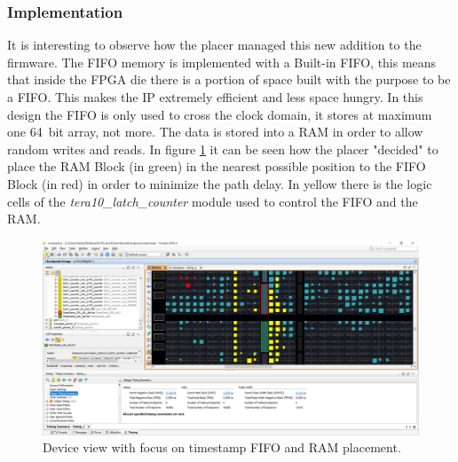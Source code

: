 \subsubsection{Implementation}
\noindent It is interesting to observe how the placer managed this new addition to the firmware. The FIFO memory is implemented with a Built-in FIFO, this means that inside the FPGA die there is a portion of space built with the purpose to be a FIFO. This makes the IP extremely efficient and less space hungry.
In this design the FIFO is only used to cross the clock domain, it stores at maximum one 64~bit array, not more. The data is stored into a RAM in order to allow random writes and reads.
In figure \ref{fig:fifonearram} it can be seen how the placer "decided" to place the RAM Block (in green) in the nearest possible position to the FIFO Block (in red) in order to minimize the path delay. In yellow there is the logic cells of the \textit{tera10\_latch\_counter} module used to control the FIFO and the RAM.
\begin{figure}[H]
	\centering
	\includegraphics[width=0.95\linewidth]{IMG/ch4/FIFOnearRAM}
	\caption{Device view with focus on timestamp FIFO and RAM placement.}
	\label{fig:fifonearram}
\end{figure}

